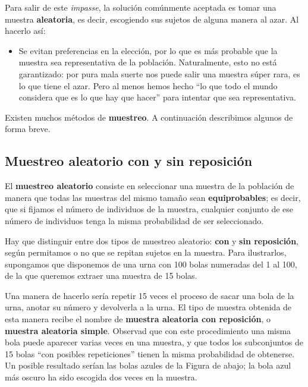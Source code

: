 \documentclass[
  spanish,
  letterpaper,
  DIV=11,
  numbers=noendperiod]{scrreprt}
\providecommand{\tightlist}{%
  \setlength{\itemsep}{0pt}\setlength{\parskip}{0pt}}
\begin{document}
Para salir de este \emph{impasse}, la solución comúnmente aceptada es
tomar una muestra \textbf{aleatoria}, es decir, escogiendo sus sujetos
de alguna manera al azar. Al hacerlo así:

\begin{itemize}
\tightlist
\item
  Se evitan preferencias en la elección, por lo que es más probable que
  la muestra sea representativa de la población. Naturalmente, esto no
  está garantizado: por pura mala suerte nos puede salir una muestra
  súper rara, es lo que tiene el azar. Pero al menos hemos hecho ``lo
  que todo el mundo considera que es lo que hay que hacer'' para
  intentar que sea representativa.
\end{itemize}

Existen muchos métodos de \textbf{muestreo}. A continuación describimos
algunos de forma breve.

\subsection{Muestreo aleatorio con y sin
reposición}\label{muestreo-aleatorio-con-y-sin-reposiciuxf3n}

El \textbf{muestreo aleatorio} consiste en seleccionar una muestra de la
población de manera que todas las muestras del mismo tamaño sean
\textbf{equiprobables}; es decir, que si fijamos el número de individuos
de la muestra, cualquier conjunto de ese número de individuos tenga la
misma probabilidad de ser seleccionado.

Hay que distinguir entre dos tipos de muestreo aleatorio: \textbf{con} y
\textbf{sin reposición}, según permitamos o no que se repitan sujetos en
la muestra. Para ilustrarlos, supongamos que disponemos de una urna con
100 bolas numeradas del 1 al 100, de la que queremos extraer una muestra
de 15 bolas.

Una manera de hacerlo sería repetir 15 veces el proceso de sacar una
bola de la urna, anotar su número y devolverla a la urna. El tipo de
muestra obtenida de esta manera recibe el nombre de \textbf{muestra
aleatoria con reposición}, o \textbf{muestra aleatoria simple}. Observad
que con este procedimiento una misma bola puede aparecer varias veces en
una muestra, y que todos los subconjuntos de 15 bolas ``con posibles
repeticiones'' tienen la misma probabilidad de obtenerse. Un posible
resultado serían las bolas azules de la Figura de abajo; la bola azul
más oscuro ha sido escogida dos veces en la muestra.
\end{document}
